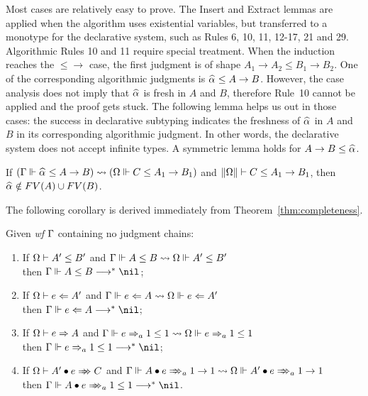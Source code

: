 Most cases are relatively easy to prove.
The Insert and Extract lemmas are applied when the algorithm uses existential variables,
but transferred to a monotype for the declarative system,
such as Rules 6, 10, 11, 12-17, 21 and 29.
Algorithmic Rules 10 and 11 require special treatment.
When the induction reaches the $\mathtt{{\le}{\to}}$ case,
the first judgment is of shape $A_1 \to A_2 \le B_1 \to B_2$.
One of the corresponding algorithmic judgments is $\al \le A \to B$.
However, the case analysis does not imply that $\al$ is fresh in $A$ and $B$,
therefore Rule~10 cannot be applied and the proof gets stuck.
The following lemma helps us out in those cases:
the success in declarative subtyping indicates the freshness of $\al$ in $A$ and $B$
in its corresponding algorithmic judgment.
In other words, the declarative system does not accept infinite types.
A symmetric lemma holds for $A\to B \le \al$.

\begin{lemma}\label{lem:prune_inst}
If $(\Gm \Vdash \al \le A \to B) \sto (\Om \Vdash C \le A_1 \to B_1)$ and
$\|\Omega\| \vdash C \le A_1 \to B_1$, then $\al\notin FV(A) \cup FV(B)$.
\end{lemma}

The following corollary is derived immediately from Theorem~\ref{thm:completeness}.
\begin{corollary}
Given \emph{wf }$\Gamma$ containing no judgment chains:
\begin{enumerate}
    \item If $\Omega \vdash A' \le B'$ and $\Gamma \Vdash A \le B \rightsquigarrow \Omega \Vdash A' \le B'$
        \\then $\Gm \Vdash A \le B \redto \nil$;
    \item If $\Omega \vdash e \Leftarrow A'$ and $\Gamma \Vdash e \Leftarrow A \rightsquigarrow \Omega \Vdash e \Leftarrow A'$
        \\then $\Gm \Vdash e \Lto A \redto \nil$;
    \item If $\Omega \vdash e \Rightarrow A$ and $\Gamma \Vdash e \Rightarrow_a 1 \le 1 \rightsquigarrow \Omega \Vdash e \Rightarrow_a 1 \le 1$
        \\then $\Gm \Vdash e \To_a 1 \le 1 \redto \nil$;
    \item If $\Om \vdash \appInf{A'}{e}{C}$ and
        $\Gm \Vdash \appInfAlg{A}{e}[a][1 \to 1] \sto \Om \Vdash \appInfAlg{A'}{e}[a][1 \to 1]$
        \\then $\Gm \Vdash \appInfAlg{A}{e}[a][1 \le 1] \redto \nil$.
\end{enumerate}
\end{corollary}

